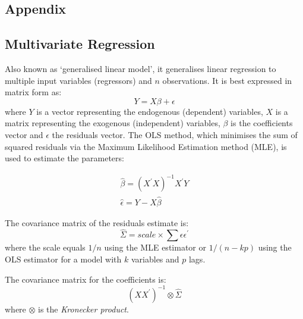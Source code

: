 \documentclass[11pt]{article}
\begin{document}

    \newpage 
    
    
\begin{appendices}    
    
    \chapter{{\huge \bf Appendix}} \label{appendixA}
    
    \section{Multivariate Regression}\label{multivariate-regression}
    
Also known as `generalised linear model', it generalises linear
regression to multiple input variables (regressors) and \(n\)
observations. It is best expressed in matrix form as:
\begin{equation}
Y = X \beta + \epsilon
\end{equation}
where \(Y\) is a vector representing the endogenous (dependent)
variables, \(X\) is a matrix representing the exogenous (independent)
variables, \(\beta\) is the coefficients vector and \(\epsilon\) the
residuals vector.
The OLS method, which minimises the sum of squared residuals via the
Maximum Likelihood Estimation method (MLE), is used to estimate the
parameters:

\begin{align}
\hat{\beta} = (X^\prime X)^{-1} X^\prime Y \\
\hat{\epsilon} = Y - X \hat{\beta}
\end{align}

The covariance matrix of the residuals estimate is:
\begin{equation}
\hat{\Sigma} = scale \times  \sum \epsilon \epsilon^\prime
\end{equation} where the scale equals  \(1/ n\) using the MLE estimator or
\(1/ (n - kp)\) using the OLS estimator for a model with \(k\)
variables and \(p\) lags.


The covariance matrix for the coefficients is:
\begin{equation}
(X X^\prime)^{-1} \otimes \hat{\Sigma}
\end{equation} where \(\otimes\) is the \emph{Kronecker product}.



\end{appendices}
\end{document}

